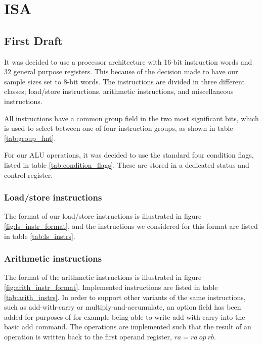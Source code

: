 \section{ISA}

\subsection{First Draft}
It was decided to use a processor architecture with 16-bit instruction words
and 32 general purpose registers. This because of the decision made to have our
sample sizes set to 8-bit words. The instructions are divided in three
different classes; load/store instructions, arithmetic instructions, and
miscellaneous instructions.

All instructions have a common group field in the
two most significant bits, which is used to select between one of four
instruction groups, as shown in table \ref{tab:group_fmt}.

For our ALU operations, it was decided to use the standard four condition flags,
listed in table \ref{tab:condition_flags}. These are stored in a dedicated
status and control register.




\subsubsection{Load/store instructions}
The format of our load/store instructions is illustrated in figure
\ref{fig:ls_instr_format}, and the instructions we considered for this format
are listed in table \ref{tab:ls_instrs}.




\subsubsection{Arithmetic instructions}
The format of the arithmetic instructions is illustrated in figure
\ref{fig:arith_instr_format}.
Implemented instructions are listed in table \ref{tab:arith_instrs}. In order to
support other variants of the same instructions, such as add-with-carry or
multiply-and-accumulate, an option field has been added for purposes of for
example being able to write add-with-carry into the basic add command. The
operations are implemented such that the result of an operation is written back
to the first operand register, $ra = ra~op~rb$.

